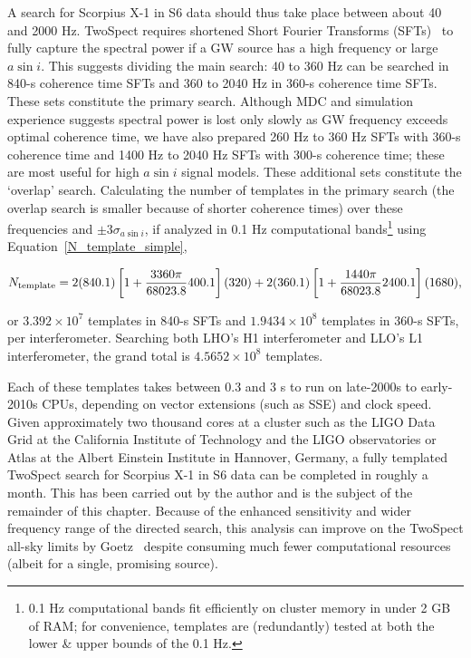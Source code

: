 A search for Scorpius X-1 in S6 data should thus take place between about 40 and 2000 Hz. 
TwoSpect requires shortened Short Fourier Transforms (SFTs)~\cite{GoetzTwoSpectMethods2011} to fully capture the spectral power if a GW source has a high frequency or large $a \sin i$. 
This suggests dividing the main search: 40 to 360 Hz can be searched in 840-s coherence time SFTs and 360 to 2040 Hz in 360-s coherence time SFTs.
These sets constitute the primary search.
Although MDC and simulation experience suggests spectral power is lost only slowly as GW frequency exceeds optimal coherence time, we have also prepared 260 Hz to 360 Hz SFTs with 360-s coherence time and 1400 Hz to 2040 Hz SFTs with 300-s coherence time; these are most useful for high $a \sin i$ signal models.
These additional sets constitute the `overlap' search.
Calculating the number of templates in the primary search (the overlap search is smaller because of shorter coherence times) over these frequencies and $\pm 3 \sigma_{a \sin i}$, if analyzed in 0.1 Hz computational bands\footnote{0.1 Hz computational bands fit efficiently on cluster memory in under 2 GB of RAM; for convenience, templates are (redundantly) tested at both the lower \& upper bounds of the 0.1 Hz.} using Equation~\ref{N_template_simple},

\begin{equation}
N_\textup{template} = 2 (840.1)\left[1+ \frac{3360\pi}{68023.8} 400.1 \right](320) + 2 (360.1)\left[1+ \frac{1440\pi}{68023.8}2400.1\right](1680),
\label{S6_N_templates}
\end{equation}

\noindent or $3.392\times 10^7$ templates in 840-s SFTs and $1.9434\times 10^8$ templates in 360-s SFTs, per interferometer.
Searching both LHO's H1 interferometer and LLO's L1 interferometer, the grand total is $4.5652\times10^8$ templates.

Each of these templates takes between 0.3 and 3 s to run on late-2000s to early-2010s CPUs, depending on vector extensions (such as SSE) and clock speed.
Given approximately two thousand cores at a cluster such as the LIGO Data Grid at the California Institute of Technology and the LIGO observatories or Atlas at the Albert Einstein Institute in Hannover, Germany, a fully templated TwoSpect search for Scorpius X-1 in S6 data can be completed in roughly a month.
This has been carried out by the author and is the subject of the remainder of this chapter.
Because of the enhanced sensitivity and wider frequency range of the directed search, this analysis can improve on the TwoSpect all-sky limits by Goetz~\cite{GoetzTwoSpectResults2014} despite consuming much fewer computational resources (albeit for a single, promising source).

